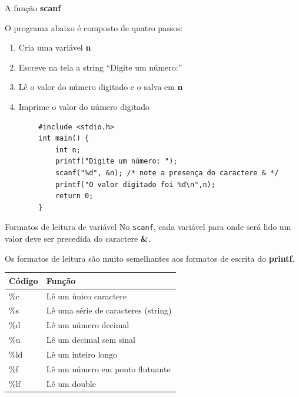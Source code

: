 \documentclass[handout]{beamer}
\newcommand{\cod}[1]{\texttt{#1}}
\begin{document}
\begin{frame}[fragile]{A função {\bf scanf}}

    O programa abaixo é composto de quatro passos:
    \begin{enumerate}
        \item Cria uma variável {\bf n}
        \item Escreve na tela a string ``Digite um número:''
        \item Lê o valor do número digitado e o salva em \textbf{n}
        \item Imprime o valor do número digitado
    \end{enumerate}

    \begin{verbatim}
        #include <stdio.h>
        int main() {
            int n;
            printf("Digite um número: ");
            scanf("%d", &n); /* note a presença do caractere & */
            printf("O valor digitado foi %d\n",n);
            return 0;
        }
    \end{verbatim}
\end{frame}

\begin{frame}[fragile]{Formatos de leitura de variável}
    No \cod{scanf}, cada variável para onde será lido um valor deve ser precedida do caractere {\bf \&}.
    \pause

    Os formatos de leitura são muito semelhantes aos formatos de escrita do {\bf printf}.
  
    \begin{center}
        \begin{tabular} {|l|l|}
            \hline \textbf{Código} & \textbf{Função} \\
            \hline  \%c & Lê um único caractere \\
            \%s & Lê uma série de caracteres (string) \\
            \%d & Lê um número decimal \\
            \%u & Lê um decimal sem sinal \\
            \%ld & Lê um inteiro longo \\
            \%f & Lê um número em ponto flutuante \\
            \%lf & Lê um double \\ \hline
        \end{tabular}
    \end{center}
\end{frame}
\end{document}
